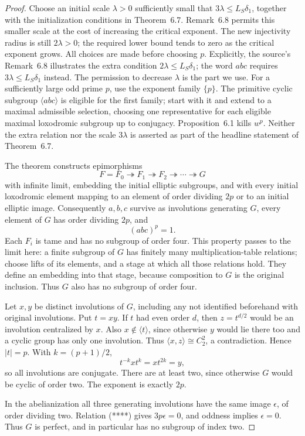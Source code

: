 \begin{proof}
Choose an initial scale \(\lambda>0\) sufficiently small that
\(3\lambda\le L_S\delta_1\), together with the initialization
conditions in Theorem~6.7. Remark~6.8 permits this smaller scale
at the cost of increasing the critical exponent.
The new injectivity radius is still \(2\lambda>0\); the required
lower bound tends to zero as the critical exponent grows.
All choices are made before choosing \(p\).
Explicitly, the source's Remark~6.8 illustrates the extra condition
\(2\lambda\le L_S\delta_1\); the word \(abc\) requires
\(3\lambda\le L_S\delta_1\) instead. The permission to decrease
\(\lambda\) is the part we use. For a sufficiently large odd prime
\(p\), use the exponent family \(\{p\}\). The primitive cyclic
subgroup \(\langle abc\rangle\) is eligible for the first family;
start with it and extend to a maximal admissible selection, choosing
one representative for each eligible maximal loxodromic subgroup
up to conjugacy. Proposition~6.1 kills \(w^p\).
Neither the extra relation nor the scale \(3\lambda\) is asserted
as part of the headline statement of Theorem~6.7.

The theorem constructs epimorphisms
\[
 F=F_0\twoheadrightarrow F_1\twoheadrightarrow F_2
 \twoheadrightarrow\cdots\twoheadrightarrow G
\]
with infinite limit, embedding the initial elliptic subgroups,
and with every initial loxodromic element mapping to an element
of order dividing \(2p\) or to an initial elliptic image.
Consequently \(a,b,c\) survive as involutions generating \(G\),
every element of \(G\) has order dividing \(2p\), and
\[
 (abc)^p=1.                                           \tag{****}
\]
Each \(F_i\) is tame and has no subgroup of order four.
This property passes to the limit here: a finite subgroup of \(G\)
has finitely many multiplication-table relations; choose lifts of
its elements, and a stage at which all those relations hold.
They define an embedding into that stage, because composition to
\(G\) is the original inclusion.
Thus \(G\) also has no subgroup of order four.

Let \(x,y\) be distinct involutions of \(G\), including any not
identified beforehand with original involutions. Put \(t=xy\).
If \(t\) had even order \(d\), then \(z=t^{d/2}\) would be an
involution centralized by \(x\).
Also \(x\notin\langle t\rangle\), since otherwise \(y\) would lie
there too and a cyclic group has only one involution.
Thus \(\langle x,z\rangle\cong C_2^2\), a contradiction.
Hence \(|t|=p\). With \(k=(p+1)/2\),
\[
 t^{-k}xt^k=xt^{2k}=y,
\]
so all involutions are conjugate. There are at least two, since
otherwise \(G\) would be cyclic of order two. The exponent is exactly
\(2p\).

In the abelianization all three generating involutions have the same
image \(\epsilon\), of order dividing two. Relation (****) gives
\(3p\epsilon=0\), and oddness implies \(\epsilon=0\).
Thus \(G\) is perfect, and in particular has no subgroup of index two.
\end{proof}

